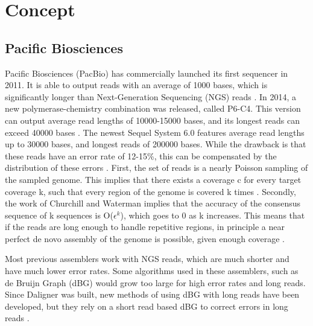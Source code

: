\documentclass[../thesis.tex]{subfiles}
\begin{document}
\chapter{Concept}
\ifdefined\main
\newcommand{\codePath}{3_concept/code/}
\newcommand{\figPath}{3_concept/figures/}
\else

\fi

\section{Pacific Biosciences}
Pacific Biosciences (PacBio) has commercially launched its first sequencer in 2011.
It is able to output reads with an average of 1000 bases, which is significantly longer than Next-Generation Sequencing (NGS) reads \cite{PBlaunch1}.
In 2014, a new polymerase-chemistry combination was released, called P6-C4.
This version can output average read lengths of 10000-15000 bases, and its longest reads can exceed 40000 bases \cite{pacbio_readlength}.
The newest Sequel System 6.0 features average read lengths up to 30000 bases, and longest reads of 200000 bases.
While the drawback is that these reads have an error rate of 12-15\%, this can be compensated by the distribution of these errors \cite{Daligner}.
First, the set of reads is a nearly Poisson sampling of the sampled genome.
This implies that there exists a coverage c for every target coverage k, such that every region of the genome is covered k times \cite{Poisson}.
Secondly, the work of Churchill and Waterman \cite{quality} implies that the accuracy of the consensus sequence of k sequences is O($\epsilon^k$), which goes to 0 as k increases.
This means that if the reads are long enough to handle repetitive regions, in principle a near perfect de novo assembly of the genome is possible, given enough coverage \cite{Daligner}.

Most previous assemblers work with NGS reads, which are much shorter and have much lower error rates.
Some algorithms used in these assemblers, such as de Bruijn Graph (dBG) \cite{DeBruijn} would grow too large for high error rates and long reads.
Since Daligner was built, new methods of using dBG with long reads have been developed, but they rely on a short read based dBG to correct errors in long reads \cite{DBG1}\cite{DBG2}.
\end{document}
